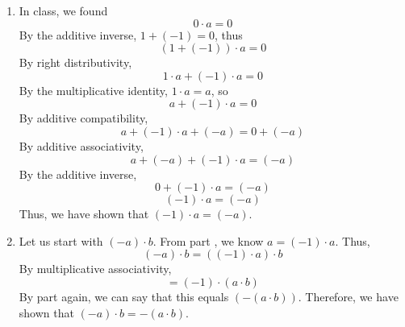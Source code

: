 \documentclass{article}
\begin{document}
\begin{enumerate}[label=\textbf{\arabic*}.]
    \begin{enumerate}[label=\textbf{\alph*}.]
        \item In class, we found
        \[0 \cdot a=0\]
        By the additive inverse, $1+(-1)=0$, thus
        \[(1+(-1)) \cdot a=0\]
        By right distributivity,
        \[1 \cdot a+(-1) \cdot a=0\]
        By the multiplicative identity, $1 \cdot a=a$, so
        \[a+(-1) \cdot a=0\]
        By additive compatibility,
        \[a+(-1) \cdot a+(-a)=0+(-a)\]
        By additive associativity,
        \[a+(-a)+(-1) \cdot a=(-a)\]
        By the additive inverse,
        \[0+(-1) \cdot a=(-a)\]
        \[(-1) \cdot a=(-a)\]
        Thus, we have shown that $(-1) \cdot a=(-a)$.
        \item Let us start with $(-a) \cdot b$. From part , we know $a=(-1)\cdot a$. Thus,
        \[(-a) \cdot b=((-1)\cdot a) \cdot b\]
        By multiplicative associativity,
        \[=(-1)\cdot (a \cdot b)\]
        By part  again, we can say that this equals $(-(a \cdot b))$. Therefore, we have shown that $(-a) \cdot b=-(a \cdot b)$.
    \end{enumerate}
\end{enumerate}
\end{document}
